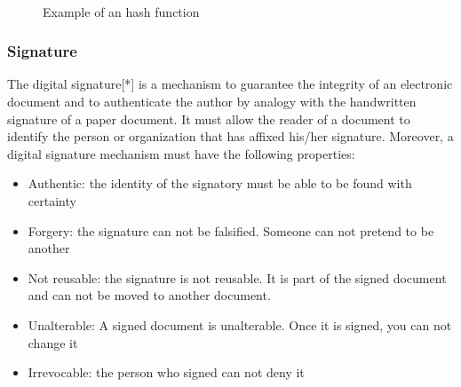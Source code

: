 \paragraph{}
\begin{figure}[!h]
\begin{center}
\caption{Example of an hash function}
\end{center}
\end{figure}

\subsubsection{Signature}

The digital signature[*] is a mechanism to guarantee the integrity of an electronic document and to authenticate the author by analogy with the handwritten signature of a paper document. It must allow the reader of a document to identify the person or organization that has affixed his/her signature. Moreover, a digital signature mechanism must have the following properties:

\begin{itemize}
  \setlength\itemsep{0em}

  \item Authentic: the identity of the signatory must be able to be found with certainty
  \item Forgery: the signature can not be falsified. Someone can not pretend to be another
  \item Not reusable: the signature is not reusable. It is part of the signed document and can not be moved to another document.
  \item Unalterable: A signed document is unalterable. Once it is signed, you can not change it
  \item Irrevocable: the person who signed can not deny it

\end{itemize}

